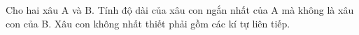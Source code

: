 Cho hai xâu A và B. Tính độ dài của xâu con ngắn nhất của A mà không là  xâu con của B. Xâu con không nhất thiết phải gồm các kí tự liên tiếp.  



\